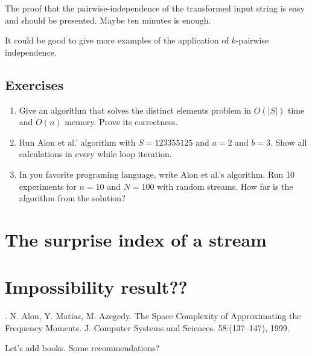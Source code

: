 \documentclass[12pt]{article}
\begin{document}
The proof that the pairwise-independence of the transformed input string is easy and should be presented. Maybe ten minutes is enough.
 
It could be good to give more examples of the application of $k$-pairwise independence.




\subsection{Exercises}


\begin{enumerate}

\item Give an algorithm that solves the distinct elements problem in $O(|S|)$ time
and $O(n)$ memory. Prove its correctness.

\item Run Alon et al.' algorithm with $S = 1 2 3 3 5 5 1 2 5$ and $a=2$ and $b=3$.
Show all calculations in every while loop iteration.

\item In you favorite programing language, write Alon et al.'s algorithm. 
Run 10 experiments for $n=10$ and $N=100$ with random streams.
How far is the algorithm from the solution?  
\end{enumerate}



\section{The surprise index of a stream}



\section{Impossibility result??}



\begin{thebibliography}{XXX}

 . N. Alon, Y. Matias, M. Azegedy. The Space Complexity of Approximating the Frequency Moments. J. Computer Systems and Sciences. 58:(137--147), 1999.

Let's add books. Some recommendations?

\end{thebibliography}
\end{document}
